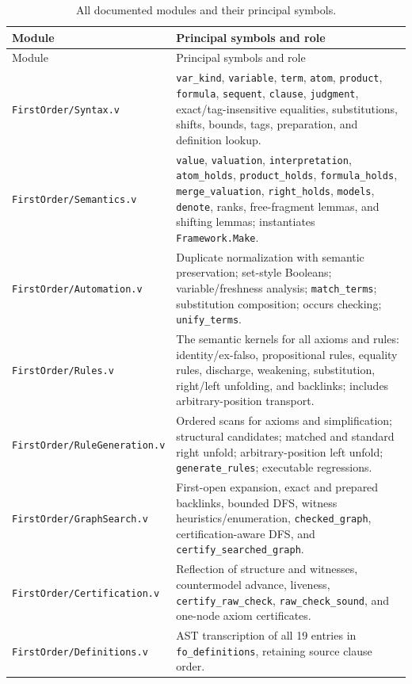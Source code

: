 \documentclass[11pt,oneside]{book}
\DeclareRobustCommand{\code}[1]{\nolinkurl{#1}}
\DeclareRobustCommand{\file}[1]{\nolinkurl{#1}}
\begin{document}
\begin{longtable}{@{}p{}p{}@{}}
\caption{All documented modules and their principal symbols.}\\
\toprule
Module & Principal symbols and role\\
\midrule
\endfirsthead
\toprule
Module & Principal symbols and role\\
\midrule
\endhead
\file{FirstOrder/Syntax.v} & \code{var_kind}, \code{variable}, \code{term}, \code{atom}, \code{product}, \code{formula}, \code{sequent}, \code{clause}, \code{judgment}, exact/tag-insensitive equalities, substitutions, shifts, bounds, tags, preparation, and definition lookup.\\
\addlinespace
\file{FirstOrder/Semantics.v} & \code{value}, \code{valuation}, \code{interpretation}, \code{atom_holds}, \code{product_holds}, \code{formula_holds}, \code{merge_valuation}, \code{right_holds}, \code{models}, \code{denote}, ranks, free-fragment lemmas, and shifting lemmas; instantiates \code{Framework.Make}.\\
\addlinespace
\file{FirstOrder/Automation.v} & Duplicate normalization with semantic preservation; set-style Booleans; variable/freshness analysis; \code{match_terms}; substitution composition; occurs checking; \code{unify_terms}.\\
\addlinespace
\file{FirstOrder/Rules.v} & The semantic kernels for all axioms and rules: identity/ex-falso, propositional rules, equality rules, discharge, weakening, substitution, right/left unfolding, and backlinks; includes arbitrary-position transport.\\
\addlinespace
\file{FirstOrder/RuleGeneration.v} & Ordered scans for axioms and simplification; structural candidates; matched and standard right unfold; arbitrary-position left unfold; \code{generate_rules}; executable regressions.\\
\addlinespace
\file{FirstOrder/GraphSearch.v} & First-open expansion, exact and prepared backlinks, bounded DFS, witness heuristics/enumeration, \code{checked_graph}, certification-aware DFS, and \code{certify_searched_graph}.\\
\addlinespace
\file{FirstOrder/Certification.v} & Reflection of structure and witnesses, countermodel advance, liveness, \code{certify_raw_check}, \code{raw_check_sound}, and one-node axiom certificates.\\
\addlinespace
\file{FirstOrder/Definitions.v} & AST transcription of all 19 entries in \code{fo_definitions}, retaining source clause order.\\

\end{longtable}
\end{document}
